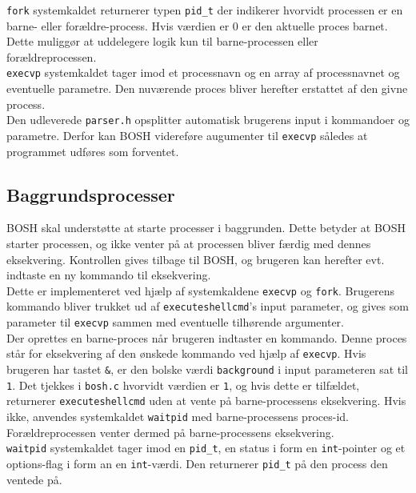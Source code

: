 \texttt{fork} systemkaldet returnerer typen \texttt{pid\_t} der indikerer hvorvidt processen er en barne- eller forældre-process. Hvis værdien er 0 er den aktuelle proces barnet. Dette muliggør at uddelegere logik kun til barne-processen eller forældreprocessen.\\

\texttt{execvp} systemkaldet tager imod et processnavn og en array af processnavnet og eventuelle parametre. Den nuværende proces bliver herefter erstattet af den givne process.\\

Den udleverede \texttt{parser.h} opsplitter automatisk brugerens input i kommandoer og parametre. Derfor kan BOSH videreføre augumenter til \texttt{execvp} således at programmet udføres som forventet.
\subsection{Baggrundsprocesser}
BOSH skal understøtte at starte processer i baggrunden. Dette betyder at BOSH starter processen, og ikke venter på at processen bliver færdig med dennes eksekvering. Kontrollen gives tilbage til BOSH, og brugeren kan herefter evt. indtaste en ny kommando til eksekvering.\\

Dette er implementeret ved hjælp af systemkaldene \texttt{execvp} og \texttt{fork}. Brugerens kommando bliver trukket ud af \texttt{executeshellcmd}'s input parameter, og gives som parameter til \texttt{execvp} sammen med eventuelle tilhørende argumenter. \\

Der oprettes en barne-proces når brugeren indtaster en kommando. Denne proces står for eksekvering af den ønskede kommando ved hjælp af \texttt{execvp}. Hvis brugeren har tastet \texttt{\&}, er den bolske værdi \texttt{background} i input parameteren sat til \texttt{1}. Det tjekkes i \texttt{bosh.c} hvorvidt værdien er \texttt{1}, og hvis dette er tilfældet, returnerer \texttt{executeshellcmd} uden at vente på barne-processens eksekvering. Hvis ikke, anvendes systemkaldet \texttt{waitpid} med barne-processens proces-id. Forældreprocessen venter dermed på barne-processens eksekvering.\\

\texttt{waitpid} systemkaldet tager imod en \texttt{pid\_t}, en status i form en \texttt{int}-pointer og et options-flag i form an en \texttt{int}-værdi. Den returnerer \texttt{pid\_t} på den process den ventede på.

